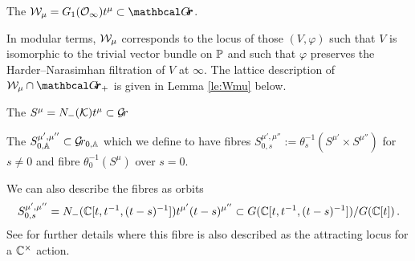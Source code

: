 \documentclass[draft]{article} %
\begin{document}
\begin{definition}
\label{def:klslice}
    The  $\cW_\mu = G_1(\Oinf) t^\mu \subset \Grth $.
\end{definition}
% 

In modular terms, $\mathcal W_\mu$ corresponds to the locus of those $ (V, \varphi)$ such that $ V $ is isomorphic to the trivial vector bundle on $ \mathbb P$ and such that $ \varphi$ preserves the {Harder--Narasimhan filtration of $V$ at $ \infty$}. The lattice description of $ \cW_\mu \cap \Grth_+$ is given in Lemma \ref{le:Wmu} below. 
% 

% 
% 
% 
\begin{definition} 
\label{def:inftyorbit}
    The  $ S^\mu = N_-(\mathcal K)t^\mu \subset \mathcal{G}\!r $
\end{definition}
\begin{definition} 
\label{def:inftyorbitfam}
    The  
 $S^{\mu', \mu''}_{0,\mathbb A} \subset {\mathcal{G}\!r_{0,\mathbb A}}$
 which we define to have fibres $ S^{\mu', \mu''}_{0,s} := \theta_s^{-1}( S^{\mu'}\times S^{\mu''}) $ for $ s \ne 0$ and fibre $ \theta_0^{-1}(S^{\mu})$ over $ s = 0 $.
\end{definition}
% 
% 
We can also describe the fibres as orbits
$$
 S^{\mu', \mu''}_{0,s} = 
    N_-(\CC[t, t^{-1}, (t-s)^{-1}])t^{\mu'} (t-s)^{\mu''} \subset G(\CC[t,t^{-1}, (t-s)^{-1}]) / G(\CC[t]) \,. %
$$
See \cite[Section~5.2]{baumann2020bases} for further details where this fibre is also described as the attracting locus for a ${\mathbb C^\times}$ action.
\end{document}
